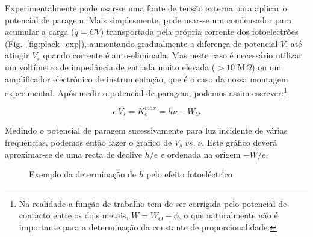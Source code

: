 \documentclass[a4paper,12pt]{article}  %
\begin{document}
Experimentalmente pode usar-se uma fonte de tensão externa para aplicar o potencial de paragem. Mais simplesmente, pode usar-se um condensador para acumular a carga ($q=C V$) transportada pela própria corrente dos fotoelectrões (Fig.~\ref{fig:plack_exp}), aumentando gradualmente a diferença de potencial $V$, até atingir $V_s$ quando corrente é  auto-eliminada. Mas neste caso é necessário utilizar um voltímetro de impedância de entrada muito elevada ($> 10\textrm{ M}\Omega$) ou um amplificador electrónico de instrumentação, que é o caso da nossa montagem experimental.
 Após medir o potencial de paragem, podemos assim escrever:\footnote{Na realidade a função de trabalho tem de ser corrigida pelo potencial de contacto entre os dois metais, $W=W_O - \phi$, o que naturalmente não é importante para a determinação da constante de proporcionalidade.}

\begin{equation}
	\label{eq:energia}
	e\,V_s= K_e^{max}= h \nu - W_O
\end{equation}

Medindo o potencial de paragem sucessivamente para luz incidente de várias frequências, podemos então fazer o gráfico de $V_s\; vs. \;\nu$. Este gráfico deverá aproximar-se de uma recta de declive $h/e$ e ordenada na origem  $-W/e$.


\begin{figure}[htb]   
\begin{center}
  \sansmath

	\caption{Exemplo da determinação de $h$ pelo efeito fotoeléctrico}
	 \label{fig:hplot} 
	\end{center}
\end{figure}
\end{document}
